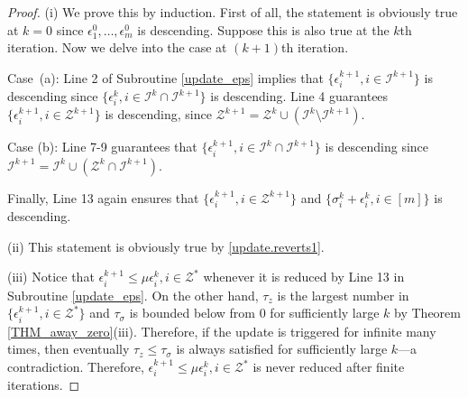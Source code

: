 \documentclass[twoside,11pt]{article}
\newcommand{\Ical}{\mathcal{I}}
\newcommand{\Zcal}{\mathcal{Z}}
\numberwithin{equation}{section}
\begin{document}
\begin{proof}
 
(i)  We prove this by induction. First of all, the statement is obviously true at $k=0$ since $\epsilon_1^0, \ldots, \epsilon_m^0$ is descending. 
Suppose this is also true at the $k$th iteration.  Now we delve into the case at $(k+1)$th iteration. 

Case~(a): 
Line 2 of  Subroutine \eqref{update_eps} implies that $\{\epsilon_i^{k+1},  i\in  \Ical^{k+1}\}$ is descending since 
$\{\epsilon_i^k, i\in \Ical^k\cap\Ical^{k+1}\}$ is descending.  Line 4 guarantees 
$\{\epsilon_i^{k+1}, i\in \Zcal^{k+1}\}$ is descending, since $\Zcal^{k+1}  = \Zcal^k \cup (\Ical^k\setminus\Ical^{k+1})$. 

Case (b): Line 7-9 guarantees that $\{\epsilon_i^{k+1},  i\in \Ical^k\cap\Ical^{k+1}\}$ is descending since 
$\Ical^{k+1}  = \Ical^k \cup (\Zcal^k\cap\Ical^{k+1})$. 

Finally,  Line 13 again ensures that $\{\epsilon_i^{k+1},  i\in \Zcal^{k+1}\}$ and $\{\sigma_i^k+\epsilon_i^k, i\in[m]\}$ 
is descending. 

   
   
(ii)  This statement  is obviously true by \eqref{update.reverts1}. 

(iii)  Notice that   $\epsilon_i^{k+1} \le \mu\epsilon_i^k, i\in\Zcal^*$ whenever 
it is reduced by Line 13 in Subroutine \ref{update_eps}.  
On the other hand, $\tau_z $ is the largest number 
in $\{\epsilon_i^{k+1}, i\in\Zcal^*\}$ and $\tau_\sigma$ is bounded below from 0 for sufficiently large $k$ by Theorem \ref{THM_away_zero}(iii). 
Therefore, if the update is triggered for infinite many times,  
then eventually $\tau_z \le \tau_\sigma$ is always satisfied for sufficiently large $k$---a contradiction. 
Therefore, $\epsilon_i^{k+1} \le \mu\epsilon_i^k, i\in\Zcal^*$ is never reduced 
after finite iterations. 
\end{proof}

















\end{document}

